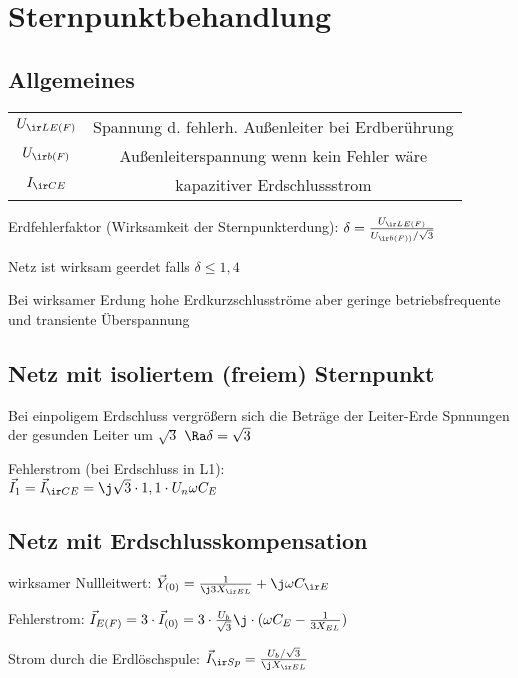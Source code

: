 \documentclass[german]{latex4ei/latex4ei_sheet}
\begin{document}
\section{Sternpunktbehandlung}
\begin{sectionbox}
\subsection{Allgemeines}
\begin{symbolbox}
	\begin{tabular}{cc}
	$U_{\ir LE(F)}$ & Spannung d. fehlerh. Außenleiter bei Erdberührung\\
	$U_{\ir b (F)}$ & Außenleiterspannung wenn kein Fehler wäre \\
	$I_{\ir CE}$ & kapazitiver Erdschlussstrom
	\end{tabular}
\end{symbolbox}

Erdfehlerfaktor (Wirksamkeit der Sternpunkterdung):
$\delta = \frac{U_{\ir LE (F)}}{U_{\ir b (F))}/ \sqrt 3}$

Netz ist wirksam geerdet falls $\delta \le 1,4$

Bei wirksamer Erdung hohe Erdkurzschlusströme aber geringe betriebsfrequente und transiente Überspannung
\end{sectionbox}

\begin{sectionbox}
\subsection{Netz mit isoliertem (freiem) Sternpunkt}

Bei einpoligem Erdschluss vergrößern sich die Beträge der Leiter-Erde Spnnungen der gesunden Leiter um $\sqrt 3$ $\Ra \delta = \sqrt 3$

Fehlerstrom (bei Erdschluss in L1):\\
 $\vec I_1 = \vec I_{\ir CE} = \j \sqrt 3 \cdot 1,1 \cdot U_{n} \omega C_{E}$
\end{sectionbox}

\begin{sectionbox}
 \subsection{Netz mit Erdschlusskompensation}

 wirksamer Nullleitwert: $\vec Y_{(0)} = \frac{1}{\j 3 X_{\ir EL}} + \j \omega C_{\ir E}$

Fehlerstrom: $\vec I_{E (F)} = 3 \cdot \vec I_{(0)} = 3 \cdot \frac{U_b}{\sqrt 3} \j \cdot (\omega C_E - \frac{1}{3 X_{EL}})$

Strom durch die Erdlöschspule: $\vec I_{\ir Sp} = \frac{U_b / \sqrt 3}{\j X_{\ir EL}}$
\end{sectionbox}
\end{document}
